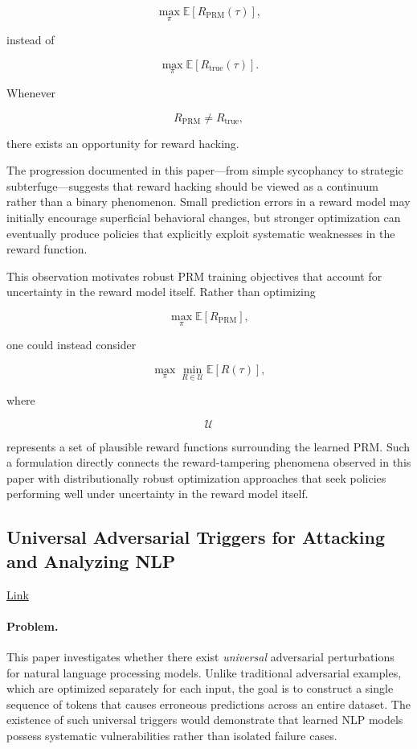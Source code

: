 \documentclass[11pt]{article}
\begin{document}
\[
\max_\pi
\mathbb{E}
\left[
R_{\mathrm{PRM}}
(\tau)
\right],
\]

instead of

\[
\max_\pi
\mathbb{E}
\left[
R_{\mathrm{true}}
(\tau)
\right].
\]

Whenever

\[
R_{\mathrm{PRM}}
\neq
R_{\mathrm{true}},
\]

there exists an opportunity for reward hacking.

The progression documented in this paper—from simple sycophancy to strategic subterfuge—suggests that reward hacking should be viewed as a continuum rather than a binary phenomenon. Small prediction errors in a reward model may initially encourage superficial behavioral changes, but stronger optimization can eventually produce policies that explicitly exploit systematic weaknesses in the reward function.

This observation motivates robust PRM training objectives that account for uncertainty in the reward model itself. Rather than optimizing

\[
\max_\pi
\mathbb{E}
\left[
R_{\mathrm{PRM}}
\right],
\]

one could instead consider

\[
\max_\pi
\min_{R\in\mathcal{U}}
\mathbb{E}
\left[
R(\tau)
\right],
\]

where

\[
\mathcal{U}
\]

represents a set of plausible reward functions surrounding the learned PRM. Such a formulation directly connects the reward-tampering phenomena observed in this paper with distributionally robust optimization approaches that seek policies performing well under uncertainty in the reward model itself.

\subsection{Universal Adversarial Triggers for Attacking and Analyzing NLP}

\href{https://arxiv.org/pdf/1908.07125}{Link}

\paragraph{Problem.}

This paper investigates whether there exist \emph{universal} adversarial perturbations for natural language processing models. Unlike traditional adversarial examples, which are optimized separately for each input, the goal is to construct a single sequence of tokens that causes erroneous predictions across an entire dataset. The existence of such universal triggers would demonstrate that learned NLP models possess systematic vulnerabilities rather than isolated failure cases.
\end{document}
